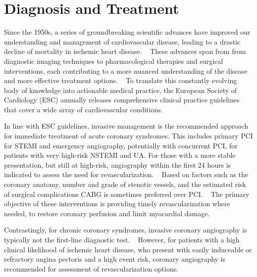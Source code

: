 \section{Diagnosis and Treatment}

Since the 1950s, a series of groundbreaking scientific advances have improved 
our understanding and management of cardiovascular disease, leading to a 
drastic decline of mortality in ischemic heart disease.
~\autocite{nabelTale2012}
These advances span from from diagnostic imaging techniques to pharmacological
therapies and surgical interventions, each contributing to a more nuanced
understanding of the disease and more effective treatment options.
~\autocite{nabelTale2012}
To translate this constantly evolving body of knowledge into actionable medical
practice, the European Society of Cardiology (ESC) annually releases
comprehensive clinical practice guidelines that cover a wide array of
cardiovascular conditions.

In line with ESC guidelines, 
invasive management is the recommended approach
for immediate treatment of acute coronary syndromes.
This includes primary \ac{PCI}%
for \ac{STEMI} and emergency angiography, 
potentially with concurrent \ac{PCI},
for patients with very high-risk \ac{NSTEMI} and \ac{UA}.
For those with a more stable presentation, but still at high-risk, 
angiography within the first 24 hours is indicated to
assess the need for revascularization. 
~\autocite{byrne20232023}
Based on factors such as the coronary anatomy, 
number and grade of stenotic vessels, 
and the estimated risk of surgical complications
\ac{CABG} is sometimes preferred over \ac{PCI}.
~\autocite{neumann20182019}
The primary objective of these interventions 
is providing timely revascularization where needed,
to restore coronary perfusion and limit myocardial damage.

Contrastingly, for chronic coronary syndromes,
invasive coronary angiography is typically not 
the first-line diagnostic test.
~\autocite{knuuti20192020}
However, for patients with a high clinical likelihood of ischemic heart
disease, who present with easily induceable or refractory angina pectoris 
and a high event risk, coronary angiography is recommended for assessment of
revascularization options.  
~\autocite{knuuti20192020}


